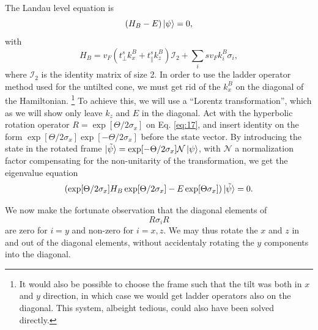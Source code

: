 The Landau level equation is
\begin{equation}
  \label{eq:17}
  \left(H_{B} - E\right) \ket{\psi } = 0,
\end{equation}
with
\begin{equation}
  \label{eq:18}
  H_{B} = v_F \left(t^s _{\perp} k^B_{x} + t^s _{\parallel} k^B_{z} \right) \mathcal{I}_2 + \sum_i s v_{F} k^B_{i} \sigma _{i},
\end{equation}
where \(\mathcal{I}_{2}\) is the identity matrix of size 2.
In order to use the ladder operator method used for the untilted cone, we must get rid of the \(k^B_{x}\) on the diagonal of the Hamiltonian.
\footnote{It would also be possible to choose the frame such that the tilt was both in \(x\) and \(y\) direction, in which case we would get ladder operators also on the diagonal.
  This system, albeight tedious, could also have been solved directly.
}
To achieve this, we will use a ``Lorentz transformation'', which as we will show only leave \(k_{z}\) and \(E\) in the diagonal.
Act with the hyperbolic rotation operator \(R = \exp[\Theta /2 \sigma_{x}]\) on Eq. \eqref{eq:17}, and insert identity on the form \(\exp[\Theta /2 \sigma_{x}]\exp[-\Theta /2 \sigma_{x}]\) before the state vector.
By introducing the state in the rotated frame \(\ket{\tilde{\psi}} = \exp[- \Theta /2 \sigma_{x}] \mathcal{N} \ket{\psi } \), with \(\mathcal{N}\) a normalization factor compensating for the non-unitarity of the transformation, we get the eigenvalue equation
\begin{equation}
  \label{eq:19}
  (\exp[\Theta /2 \sigma_{x}] H_{B}\exp[\Theta /2 \sigma_{x}] - E \exp[\Theta \sigma_{x}]) \ket{\tilde{\psi}} = 0.
\end{equation}

We now make the fortunate observation that the diagonal elements of
\[
  R \sigma_{i} R
\]
are zero for $i=y$ and non-zero for \(i=x,z\).
We may thus rotate the \(x\) and \(z\) in and out of the diagonal elements, without accidentaly rotating the \(y\) components into the diagonal.

